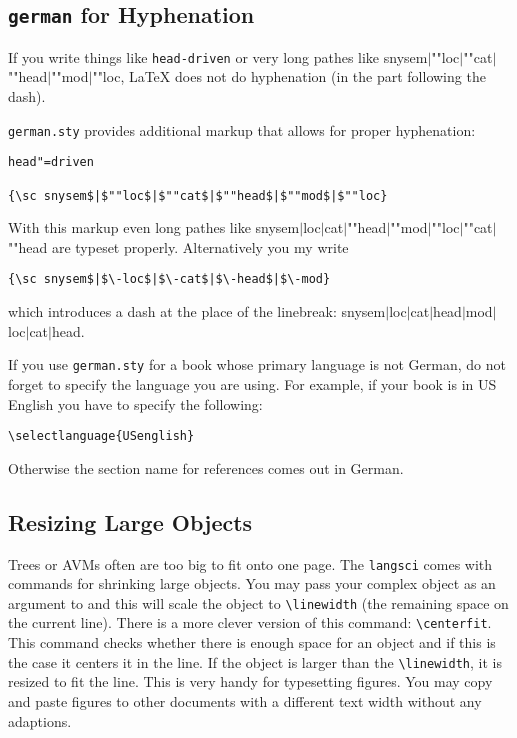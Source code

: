 

\subsection{\texttt{german} for Hyphenation}

If you write things like \verb+head-driven+ or very long pathes like
{\sc snysem$|$""loc$|$""cat$|$""head$|$""mod$|$""loc}, \LaTeX{} does not do hyphenation
(in the part following the dash).

\verb+german.sty+ provides additional markup that allows for proper hyphenation:
\begin{verbatim}
head"=driven

{\sc snysem$|$""loc$|$""cat$|$""head$|$""mod$|$""loc}
\end{verbatim}
With this markup even long pathes like {\sc snysem$|$loc$|$cat$|$""head$|$""mod$|$""loc$|$""cat$|$""head}
are typeset properly. Alternatively you my write
\begin{verbatim}
{\sc snysem$|$\-loc$|$\-cat$|$\-head$|$\-mod}
\end{verbatim}
which introduces a dash at the place of the linebreak:
{\sc snysem$|$\-loc$|$\-cat$|$\-head$|$\-mod$|$\-loc$|$\-cat$|$\-head}.

If you use \verb+german.sty+ for a book whose primary language is not German, do not forget to
specify the language you are using. For example, if your book is in US English you have to specify
the following:
\begin{verbatim}
\selectlanguage{USenglish}
\end{verbatim}
Otherwise the section name for references comes out in German.

\subsection{Resizing Large Objects}

Trees or AVMs often are too big to fit onto one page. The \texttt{langsci} comes with commands for
shrinking large objects. You may pass your complex object as an argument to \texttt{\oneline} and
this will scale the object to \verb+\linewidth+ (the remaining space on the current line). There is
a more clever version of this command: \verb+\centerfit+. This command checks whether there is
enough space for an object and if this is the case it centers it in the line. If the object is
larger than the \verb+\linewidth+, it is resized to fit the line. This is very handy for typesetting
figures. You may copy and paste figures to other documents with a different text width without any
adaptions.


